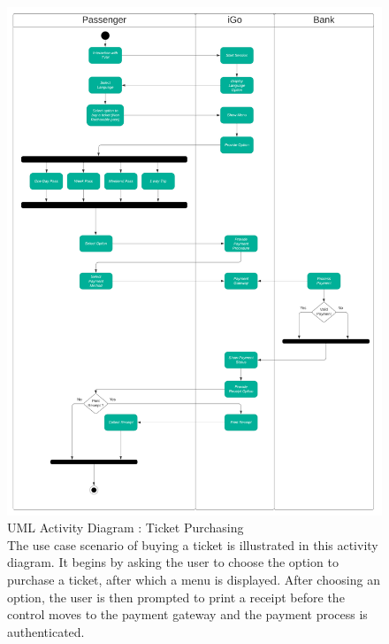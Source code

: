 \documentclass[a4paper, 11pt]{report}
\begin{document}
\begin{figure}[h]
    \centering
    \includegraphics[scale=0.15]{Activity_diagram_Ticket_Purchasing.png}    
    \caption{UML Activity Diagram : Ticket Purchasing \\
    The use case scenario of buying a ticket is illustrated in this activity diagram. It begins by asking the user to choose the option to purchase a ticket, after which a menu is displayed. After choosing an option, the user is then prompted to print a receipt before the control moves to the payment gateway and the payment process is authenticated.\\
    }
    \label{fig:Activity Diagram Ticket Purchasing}
\end{figure} 
\end{document}
